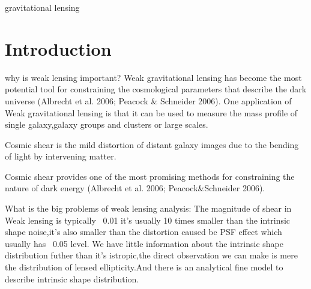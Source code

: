 \documentclass[useAMS,usenatbib]{mn2e}
\begin{document}
\begin{keywords}
  gravitational lensing
\end{keywords}

\setcounter{footnote}{1}


\section{Introduction}
\label{sec:intro}






why is weak lensing important?
Weak gravitational lensing has become the most potential tool for constraining the cosmological parameters that describe the dark universe (Albrecht et al. 2006; Peacock & Schneider 2006). 
One application of Weak gravitational lensing is that it can be used to measure the mass profile of single galaxy,galaxy groups and clusters or large scales.

Cosmic shear is the mild distortion of distant galaxy images due to the
bending of light by intervening matter.


Cosmic shear provides one of the most promising methods for constraining the nature of
dark energy (Albrecht et al. 2006; Peacock&Schneider 2006). 

What is the big problems of weak lensing analysis:
The magnitude of shear in Weak lensing is typically ~0.01 it's usually 10 times smaller than the intrinsic shape 
noise,it's also smaller than the distortion caused be PSF effect which usually has ~0.05 level.
We have little information about the intrinsic shape distribution futher than it's istropic,the direct observation we can make is mere the distribution
of lensed ellipticity.And there is an analytical fine model to describe intrinsic shape distribution.
\end{document}
